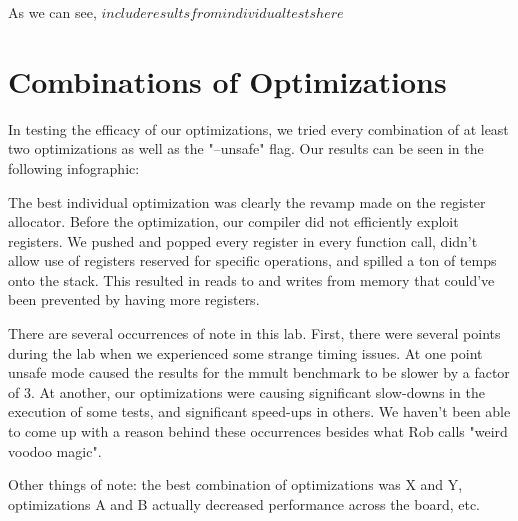 \documentclass{article}
\begin{document}
As we can see, $include results from individual tests here$


\section{Combinations of Optimizations}

In testing the efficacy of our optimizations, we tried every combination of at least two optimizations as well as the "--unsafe" flag. Our results can be seen in the following infographic:






The best individual optimization was clearly the revamp made on the register allocator. Before the optimization, our compiler did not efficiently exploit registers. We pushed and popped every register in every function call, didn't allow use of registers reserved for specific operations, and spilled a ton of temps onto the stack. This resulted in reads to and writes from memory that could've been prevented by having more registers.

There are several occurrences of note in this lab. First, there were several points during the lab when we experienced some strange timing issues. At one point unsafe mode caused the results for the mmult benchmark to be slower by a factor of 3. At another, our optimizations were causing significant slow-downs in the execution of some tests, and significant speed-ups in others. We haven't been able to come up with a reason behind these occurrences besides what Rob calls "weird voodoo magic".

Other things of note: the best combination of optimizations was X and Y, optimizations A and B actually decreased performance across the board, etc.
\end{document}

